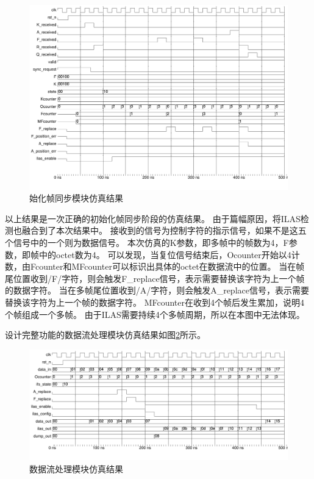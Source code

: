 \documentclass[UTF8]{ctexart}
\begin{document}
\begin{figure}[H]
	\centering
	\includegraphics[width=18cm]{./img/ifs_detection_wave.pdf}
	\caption{始化帧同步模块仿真结果}
	\label{fig:ifs_detection_wave}
\end{figure}

以上结果是一次正确的初始化帧同步阶段的仿真结果。
由于篇幅原因，将ILAS检测也融合到了本次结果中。
接收到的信号为控制字符的指示信号，如果不是这五个信号中的一个则为数据信号。
本次仿真的K参数，即多帧中的帧数为4，F参数，即帧中的octet数为4。
可以发现，当复位信号结束后，Ocounter开始以4计数，由Fcounter和MFcounter可以标识出具体的octet在数据流中的位置。
当在帧尾位置收到/F/字符，则会触发F\_replace信号，表示需要替换该字符为上一个帧的数据字符。
当在多帧尾位置收到/A/字符，则会触发A\_replace信号，表示需要替换该字符为上一个帧的数据字符。
MFcounter在收到4个帧后发生累加，说明4个帧组成一个多帧。
由于ILAS需要持续4个多帧周期，所以在本图中无法体现。

设计完整功能的数据流处理模块仿真结果如图\ref{fig:data_flow_wave}所示。

\begin{figure}[H]
	\centering
	\includegraphics[width=18cm]{./img/data_flow_wave.pdf}
	\caption{数据流处理模块仿真结果}
	\label{fig:data_flow_wave}
\end{figure}
\end{document}
